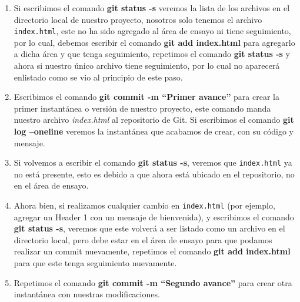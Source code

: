 \begin{enumerate}
    \item Si escribimos el comando \textbf{git status -s} veremos la lista de los archivos en el directorio local de nuestro proyecto, nosotros solo tenemos el archivo \texttt{index.html}, este no ha sido agregado al área de ensayo ni tiene seguimiento, por lo cual, debemos escribir el comando \textbf{git add index.html} para agregarlo a dicha área y que tenga seguimiento, repetimos el comando \textbf{git status -s} y ahora si nuestro único archivo tiene seguimiento, por lo cual no aparecerá enlistado como se vio al principio de este paso.
    \item Escribimos el comando \textbf{git commit -m “Primer avance”} para crear la primer instantánea o versión de nuestro proyecto, este comando manda nuestro archivo \textit{index.html} al repositorio de Git. Si escribimos el comando \textbf{git log –oneline} veremos la instantánea que acabamos de crear, con su código y mensaje.
    \item Si volvemos a escribir el comando \textbf{git status -s}, veremos que \texttt{index.html} ya no está presente, esto es debido a que ahora está ubicado en el repositorio, no en el área de ensayo.
    \item Ahora bien, si realizamos cualquier cambio en \texttt{index.html} (por ejemplo, agregar un Header 1 con un mensaje de bienvenida), y escribimos el comando \textbf{git status -s}, veremos que este volverá a ser listado como un archivo en el directorio local, pero debe estar en el área de ensayo para que podamos realizar un commit nuevamente, repetimos el comando \textbf{git add index.html} para que este tenga seguimiento nuevamente.
    \item Repetimos el comando \textbf{git commit -m “Segundo avance”} para crear otra instantánea con nuestras modificaciones.

\end{enumerate}

